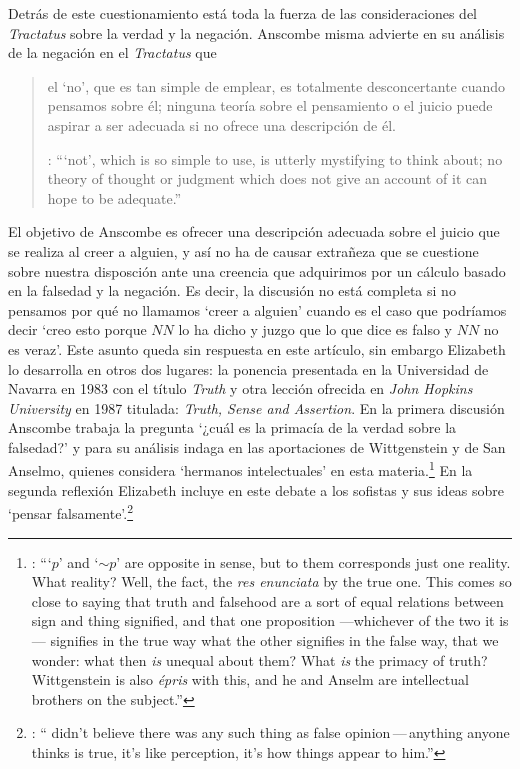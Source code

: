 Detrás de este cuestionamiento está toda la fuerza de las consideraciones del \emph{Tractatus} sobre la verdad y la negación. Anscombe misma advierte en su análisis de la negación en el \emph{Tractatus} que \blockquote[{\cite[19]{anscombe1959iwt}}: \enquote{`not', which is so simple to use, is utterly mystifying to think about; no theory of thought or judgment which does not give an account of it can hope to be adequate.}]{el `no', que es tan simple de emplear, es totalmente desconcertante cuando pensamos sobre él; ninguna teoría sobre el pensamiento o el juicio puede aspirar a ser adecuada si no ofrece una descripción de él.} El objetivo de Anscombe es ofrecer una descripción adecuada sobre el juicio que se realiza al creer a alguien, y así no ha de causar extrañeza que se cuestione sobre nuestra disposción ante una creencia que adquirimos por un cálculo basado en la falsedad y la negación. Es decir, la discusión no está completa si no pensamos por qué no llamamos `creer a alguien' cuando es el caso que podríamos decir \enquote*{creo esto porque $NN$ lo ha dicho y juzgo que lo que dice es falso y $NN$ no es veraz}. Este asunto queda sin respuesta en este artículo, sin embargo Elizabeth lo desarrolla en otros dos lugares: la ponencia presentada en la Universidad de Navarra en 1983 con el título \emph{Truth} y otra lección ofrecida en \emph{John Hopkins University} en 1987 titulada: \emph{Truth, Sense and Assertion}. En la primera discusión Anscombe trabaja la pregunta \enquote*{¿cuál es la primacía de la verdad sobre la falsedad?} y para su análisis indaga en las aportaciones de Wittgenstein y de San Anselmo, quienes considera `hermanos intelectuales' en esta materia.\footnote{\cite[Cf.~][73]{anscombe2011plato:truth}: \enquote{`$p$' and `${\sim}p$' are opposite in sense, but to them corresponds just one reality. What reality? Well, the fact, the \emph{res enunciata} by the true one. This comes so close to saying that truth and falsehood are a sort of equal relations between sign and thing signified, and that one proposition ---whichever of the two it is--- signifies in the true way what the other signifies in the false way, that we wonder: what then \emph{is} unequal about them? What \emph{is} the primacy of truth? Wittgenstein is also \emph{épris} with this, and he and Anselm are intellectual brothers on the subject.}} En la segunda reflexión Elizabeth incluye en este debate a los sofistas y sus ideas sobre `pensar falsamente'.\footnote{\cite[264]{anscombe2015logic:tsa}: \enquote{ didn't believe there was any such thing as false opinion\,---\,anything anyone thinks is true, it's like perception, it's how things appear to him.}}


